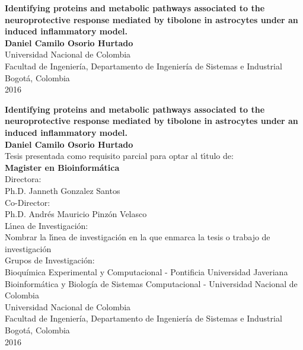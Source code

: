 \begin{center}
\begin{figure}
\centering%
%
\end{figure}
\thispagestyle{empty} \vspace*{2.0cm} \textbf{\huge
Identifying proteins and metabolic pathways associated to the neuroprotective response mediated by tibolone in astrocytes under an induced inflammatory model.}\\[3.0cm]
\Large\textbf{Daniel Camilo Osorio Hurtado}\\[6.0cm]
\small Universidad Nacional de Colombia\\
Facultad de Ingeniería, Departamento de Ingeniería de Sistemas e Industrial\\
Bogotá, Colombia\\
2016\\
\end{center}

\newpage{\pagestyle{empty}\cleardoublepage}

\newpage
\begin{center}
\thispagestyle{empty} \vspace*{0cm} \textbf{\huge
Identifying proteins and metabolic pathways associated to the neuroprotective response mediated by tibolone in astrocytes under an induced inflammatory model.}\\[2.0cm]
\Large\textbf{Daniel Camilo Osorio Hurtado}\\[2.0cm]
\small Tesis presentada como requisito parcial para optar al
t\'{\i}tulo de:\\
\textbf{Magister en Bioinformática}\\[1.5cm]
Directora:\\
Ph.D. Janneth Gonzalez Santos\\[0.7cm]
Co-Director:\\
Ph.D. Andrés Mauricio Pinzón Velasco\\[1.5cm]
L\'{\i}nea de Investigaci\'{o}n:\\
Nombrar la l\'{\i}nea de investigaci\'{o}n en la que enmarca la tesis  o trabajo de investigaci\'{o}n\\
Grupos de Investigaci\'{o}n:\\
Bioquímica Experimental y Computacional - Pontificia Universidad Javeriana \\
Bioinformática y Biología de Sistemas Computacional - Universidad Nacional de Colombia\\[1.7cm]
Universidad Nacional de Colombia\\
Facultad de Ingeniería, Departamento de Ingeniería de Sistemas e Industrial\\
Bogotá, Colombia\\
2016
\end{center}